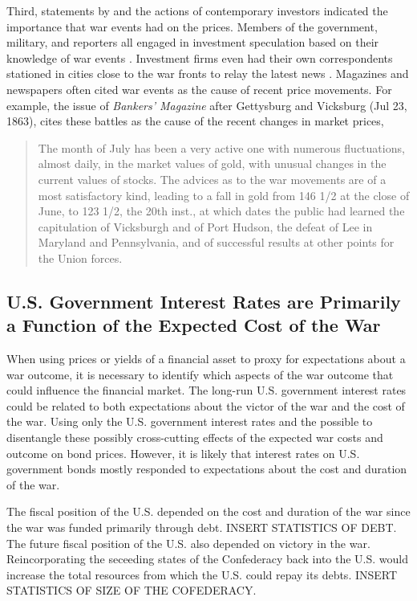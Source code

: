 Third, statements by and the actions of contemporary investors indicated the importance that war events had on the prices. %
Members of the government, military, and reporters all engaged in investment speculation based on their knowledge of war events \parencites[5-7]{Cornwallis1879}{Mitchell1903}[][1004]{WillardGuinnaneEtAl1996}.
Investment firms even had their own correspondents stationed in cities close to the war fronts to relay the latest news \parencites[5-7]{Cornwallis1879}. %
Magazines and newspapers often cited war events as the cause of recent price movements. %
For example, the issue of \textit{Bankers' Magazine} after Gettysburg and Vicksburg (Jul 23, 1863), cites these battles as the cause of the recent changes in market prices,
\begin{quote}
  The month of July has been a very active one with numerous fluctuations, almost daily, in the market values of gold, with unusual changes in the current values of stocks. %
  The advices as to the war movements are of a most satisfactory kind, leading to a fall in gold from 146 1/2 at the close of June, to 123 1/2, the 20th inst., at which dates the public had learned the  capitulation of Vicksburgh and of Port Hudson, the defeat of Lee in  Maryland and Pennsylvania, and of successful results at other points  for the Union forces. %
\parencite[159]{BankersMagazine1864}
\end{quote}



\subsection{U.S. Government Interest Rates are Primarily a Function of the Expected Cost of the War}
\label{bonds_battles:sec:u.s.-governm-inter}

When using prices or yields of a financial asset to proxy for expectations about a war outcome, it is necessary to identify which aspects of the war outcome that could influence the financial market.
The long-run U.S. government interest rates could be related to both expectations about the victor of the war and the cost of the war.
Using only the U.S. government interest rates and the  possible to disentangle these possibly cross-cutting effects of the expected war costs and outcome on bond prices.
However, it is likely that interest rates on U.S. government bonds mostly responded to expectations about the cost and duration of the war.

The fiscal position of the U.S. depended on the cost and duration of the war since the war was funded primarily through debt.
INSERT STATISTICS OF DEBT.
The future fiscal position of the U.S. also depended on victory in the war.
Reincorporating the seceeding states of the Confederacy back into the U.S. would increase the total resources from which the U.S. could repay its debts.
INSERT STATISTICS OF SIZE OF THE COFEDERACY.

